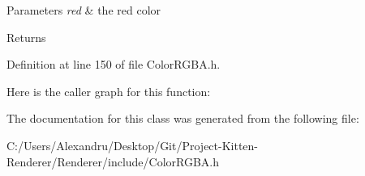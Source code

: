 \begin{DoxyParams}{Parameters}
{\em red} & the red color \\
\hline
\end{DoxyParams}
\begin{DoxyReturn}{Returns}

\end{DoxyReturn}


Definition at line 150 of file Color\+R\+G\+B\+A.\+h.



Here is the caller graph for this function\+:




The documentation for this class was generated from the following file\+:\begin{DoxyCompactItemize}
\item 
C\+:/\+Users/\+Alexandru/\+Desktop/\+Git/\+Project-\/\+Kitten-\/\+Renderer/\+Renderer/include/Color\+R\+G\+B\+A.\+h\end{DoxyCompactItemize}
